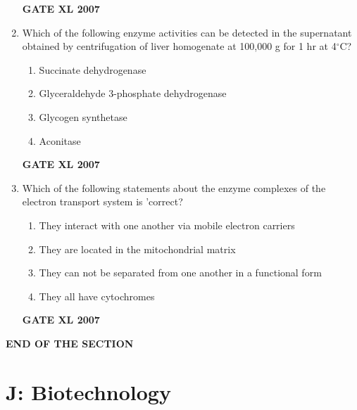 \documentclass[journal,12pt,onecolumn]{IEEEtran}
\begin{document}
\begin{enumerate}
	    \hfill \textbf{GATE XL 2007}
    \item Which of the following enzyme activities can be detected in the supernatant obtained by centrifugation of liver homogenate at 100,000 g for 1 hr at 4$^{\circ}$C? 
        \begin{enumerate} 
            \item Succinate dehydrogenase
            \item Glyceraldehyde 3-phosphate dehydrogenase
            \item Glycogen synthetase
            \item Aconitase
        \end{enumerate}
    
	    \hfill \textbf{GATE XL 2007}
    \item Which of the following statements about the enzyme complexes of the electron transport system is 'correct? 
        \begin{enumerate} 
            \item They interact with one another via mobile electron carriers
            \item They are located in the mitochondrial matrix
            \item They can not be separated from one another in a functional form
            \item They all have cytochromes
        \end{enumerate}
	    \hfill \textbf{GATE XL 2007}
\end{enumerate}
\begin{center}
\textbf{END OF THE SECTION}
\end{center}
\newpage

\section*{J: Biotechnology}
\end{document}
